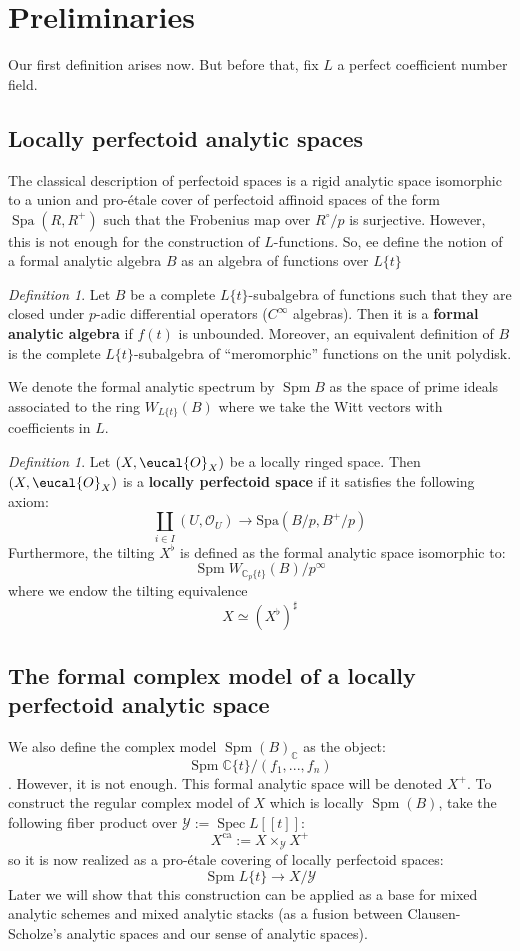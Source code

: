 \documentclass[9pt]{amsart}
\renewcommand{\[}{\begin{equation}}
\renewcommand{\]}{\end{equation}}
\newcommand{\on}{\operatorname}
\theoremstyle{plain}
\theoremstyle{remark}
\newtheorem{defin}[thm]{Definition}
\begin{document}
\section{Preliminaries}
Our first definition arises now. But before that, fix $L$ a perfect coefficient number field.
\subsection{Locally perfectoid analytic spaces} The classical description of perfectoid spaces is a rigid analytic space isomorphic to a union and pro-étale cover of perfectoid affinoid spaces of the form $\on{Spa}(R, R^+)$ such that the Frobenius map over $R^{\circ}/p$ is surjective. However, this is not enough for the construction of $L$-functions. So, ee define the notion of a formal analytic algebra $B$ as an algebra of functions over $L\{ t \}$
\begin{defin}
Let $B$ be a complete $L\{t\}$-subalgebra of functions such that they are closed under $p$-adic differential operators ($C^{\infty}$ algebras). Then it is a \textbf{formal analytic algebra} if $f(t)$ is unbounded. Moreover, an equivalent definition of $B$ is the complete $L\{t\}$-subalgebra of “meromorphic” functions on the unit polydisk.
\end{defin}
We denote the formal analytic spectrum by $\on{Spm} B$ as the space of prime ideals associated to the ring $W_{L\{t\}}(B)$ where we take the Witt vectors with coefficients in $L$. 
\begin{defin}
Let $(X, \eucal{O}_X)$ be a locally ringed space. Then $(X, \eucal{O}_X)$ is a \textbf{locally perfectoid space} if it satisfies the following axiom:
$$\coprod_{i\in I} (U, \mathcal{O}_U) \to \text{Spa}(B/p, B^+/p)$$
 Furthermore, the tilting $X^{\flat}$ is defined as the formal analytic space isomorphic to:
\[\on{Spm} W_{\mathbb{C}_p\{t\}}(B)/p^{\infty}\]
where we endow the tilting equivalence
\[X \simeq (X^{\flat})^{\sharp}\]
\end{defin}
\subsection{The formal complex model of a locally perfectoid analytic space}
We also define the complex model $\on{Spm}(B)_{\mathbb{C}}$ as the object: 
\[\on{Spm}\mathbb{C}\{t\}/(f_1,...,f_n)\].
However, it is not enough. 
This formal analytic space will be denoted $X^+$. To construct the regular complex model of $X$ which is locally $\on{Spm}(B)$, take the following fiber product over $\mathscr{Y} := \on{Spec}L[\![t]\!]$:
\[X^{\on{ca}} := X \times_{\mathscr{Y}} X^+\]
so it is now realized as a pro-étale covering of locally perfectoid spaces: 
\[\on{Spm}L\{t\} \to X/\mathscr{Y}\] 
Later we will show that this construction can be applied as a base for mixed analytic schemes and mixed analytic stacks (as a fusion between Clausen-Scholze's analytic spaces and our sense of analytic spaces).
\end{document}
